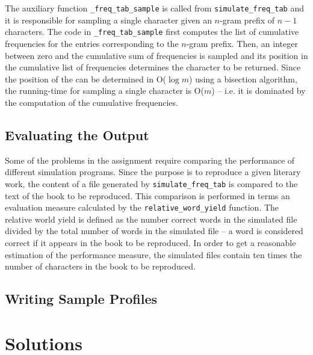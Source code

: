 \documentclass[conference]{IEEEtran}
\newcommand{\codeinline}[1]{{\fontsize{8}{0}\selectfont\texttt{#1}}}
\begin{document}
The auxiliary function \codeinline{\_freq\_tab\_sample} is called from \codeinline{simulate\_freq\_tab} and it is responsible for sampling a single character given an $n$-gram prefix of $n-1$ characters.
The code in \codeinline{\_freq\_tab\_sample} first computes the list of cumulative frequencies for the entries corresponding to the $n$-gram prefix.
Then, an integer between zero and the cumulative sum of frequencies is sampled and its position in the cumulative list of frequencies determines the character to be returned.
Since the position of the can be determined in O($\log m$) using a bisection algorithm, the running-time for sampling a single character is O($m$) 
-- i.e. it is dominated by the computation of the cumulative frequencies.


\subsection{Evaluating the Output}

Some of the problems in the assignment require comparing the performance of different simulation programs.
Since the purpose is to reproduce a given literary work, the content of a file generated by \codeinline{simulate\_freq\_tab} is compared to the text of the book to be reproduced.
This comparison is performed in terms an evaluation measure calculated by the \codeinline{relative\_word\_yield} function.
The relative world yield is defined as the number correct words in the simulated file divided by the total number of words in the simulated file
-- a word is considered correct if it appears in the book to be reproduced.
In order to get a reasonable estimation of the performance measure, the simulated files contain ten times the number of characters in the book to be reproduced.

\subsection{Writing Sample Profiles}



\section{Solutions\label{sec:solutions}}

\end{document}
